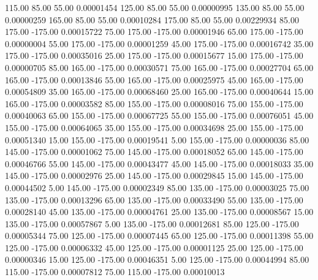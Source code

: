     115.00     85.00     55.00     0.00001454
    125.00     85.00     55.00     0.00000995
    135.00     85.00     55.00     0.00000259
    165.00     85.00     55.00     0.00010284
    175.00     85.00     55.00     0.00229934
     85.00    175.00   -175.00     0.00015722
     75.00    175.00   -175.00     0.00001946
     65.00    175.00   -175.00     0.00000004
     55.00    175.00   -175.00     0.00001259
     45.00    175.00   -175.00     0.00016742
     35.00    175.00   -175.00     0.00035016
     25.00    175.00   -175.00     0.00015677
     15.00    175.00   -175.00     0.00000705
     85.00    165.00   -175.00     0.00030571
     75.00    165.00   -175.00     0.00027704
     65.00    165.00   -175.00     0.00013846
     55.00    165.00   -175.00     0.00025975
     45.00    165.00   -175.00     0.00054809
     35.00    165.00   -175.00     0.00068460
     25.00    165.00   -175.00     0.00040644
     15.00    165.00   -175.00     0.00003582
     85.00    155.00   -175.00     0.00008016
     75.00    155.00   -175.00     0.00040063
     65.00    155.00   -175.00     0.00067725
     55.00    155.00   -175.00     0.00076051
     45.00    155.00   -175.00     0.00064065
     35.00    155.00   -175.00     0.00034698
     25.00    155.00   -175.00     0.00051340
     15.00    155.00   -175.00     0.00019541
      5.00    155.00   -175.00     0.00000036
     85.00    145.00   -175.00     0.00001062
     75.00    145.00   -175.00     0.00018052
     65.00    145.00   -175.00     0.00046766
     55.00    145.00   -175.00     0.00043477
     45.00    145.00   -175.00     0.00018033
     35.00    145.00   -175.00     0.00002976
     25.00    145.00   -175.00     0.00029845
     15.00    145.00   -175.00     0.00044502
      5.00    145.00   -175.00     0.00002349
     85.00    135.00   -175.00     0.00003025
     75.00    135.00   -175.00     0.00013296
     65.00    135.00   -175.00     0.00033490
     55.00    135.00   -175.00     0.00028140
     45.00    135.00   -175.00     0.00004761
     25.00    135.00   -175.00     0.00008567
     15.00    135.00   -175.00     0.00057867
      5.00    135.00   -175.00     0.00012681
     85.00    125.00   -175.00     0.00005344
     75.00    125.00   -175.00     0.00007445
     65.00    125.00   -175.00     0.00011398
     55.00    125.00   -175.00     0.00006332
     45.00    125.00   -175.00     0.00001125
     25.00    125.00   -175.00     0.00000346
     15.00    125.00   -175.00     0.00046351
      5.00    125.00   -175.00     0.00044994
     85.00    115.00   -175.00     0.00007812
     75.00    115.00   -175.00     0.00010013
